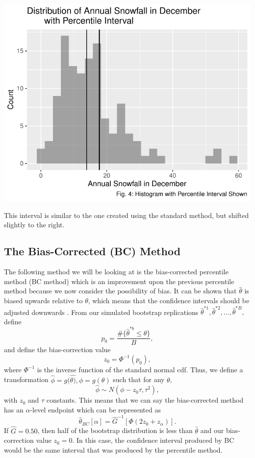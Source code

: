 \documentclass[12pt]{article}
\begin{document}
\includegraphics{paper_files/figure-latex/unnamed-chunk-5-1.pdf}

This interval is similar to the one created using the standard method,
but shifted slightly to the right.

\hypertarget{the-bias-corrected-bc-method}{%
\subsection{The Bias-Corrected (BC)
Method}\label{the-bias-corrected-bc-method}}

The following method we will be looking at is the bias-corrected
percentile method (BC method) which is an improvement upon the previous
percentile method because we now consider the possibility of bias. It
can be shown that \(\hat{\theta}\) is biased upwards relative to
\(\theta\), which means that the confidence intervals should be adjusted
downwards \citep[\citet{EfronCasi}]{Efron86}. From our simulated
bootstrap replications
\(\hat{\theta}^{*1}, \hat{\theta}^{*2}, \dots ,\hat{\theta}^{*B},\)
define \[p_0 = \frac{\#\{\hat{\theta}^{*b} \leq \theta\}}{B},\] and
define the bias-correction value \[z_0 = \Phi^{-1}(p_0),\] where
\(\Phi^{-1}\) is the inverse function of the standard normal cdf. Thus,
we define a transformation
\(\hat{\phi} = g(\hat{\theta)}, \phi = g(\theta)\) such that for any
\(\theta\), \[\hat{\phi} \sim N(\phi - z_0\tau, \tau^2),\] with \(z_0\)
and \(\tau\) constants. This means that we can say the bias-corrected
method has an \(\alpha\)-level endpoint which can be represented as
\[\hat{\theta}_{BC}[\alpha] = \hat{G}^{-1} \left [ \Phi \left ( 2z_0 + z_\alpha\right ) \right ].\]
If \(\hat{G} = 0.50\), then half of the bootstrap distribution is less
than \(\hat{\theta}\) and our bias-correction value \(z_0 = 0\). In this
case, the confidence interval produced by BC would be the same interval
that was produced by the percentile method.
\end{document}
